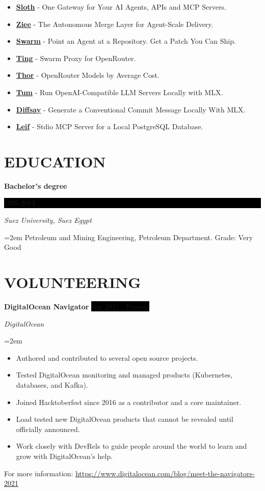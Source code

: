 \documentclass[paper=a4,fontsize=11pt]{scrartcl} %
\newcommand{\sepspace}{\vspace*{1em}}		%
\newcommand{\NewPart}[1]{\section*{\uppercase{#1}}}
\newcommand{\EducationEntry}[4]{
		\noindent \textbf{#1} \hfill      %
		\colorbox{Black}{%
			\parbox{6em}{%
			\hfill\color{White}#2}} \par  %
		\noindent \textit{#3} \par        %
		\noindent\hangindent=2em\hangafter=0 \small #4 %
		\normalsize \par}
\newcommand{\WorkEntry}[4]{				  %
		\noindent \textbf{#1} \hfill      %
		\colorbox{Black}{\color{White}#2} \par  %
		\noindent \textit{#3} \par              %
		\noindent\hangindent=2em\hangafter=0 \small #4 %
		\normalsize \par}
\begin{document}
\begin{itemize}
\item \textbf{\href{https://github.com/Clivern/Sloth}{Sloth}} - One Gateway for Your AI Agents, APIs and MCP Servers.
\item \textbf{\href{https://github.com/Clivern/Ziee}{Ziee}} - The Autonomous Merge Layer for Agent-Scale Delivery.
\item \textbf{\href{https://github.com/Clivern/Swarm}{Swarm}} - Point an Agent at a Repository. Get a Patch You Can Ship.
\item \textbf{\href{https://github.com/Clivern/Ting}{Ting}} - Swarm Proxy for OpenRouter.
\item \textbf{\href{https://github.com/Clivern/Thor}{Thor}} - OpenRouter Models by Average Cost.
\item \textbf{\href{https://github.com/Clivern/Tum}{Tum}} - Run OpenAI-Compatible LLM Servers Locally with MLX.
\item \textbf{\href{https://github.com/Clivern/Diffsay}{Diffsay}} - Generate a Conventional Commit Message Locally With MLX.
\item \textbf{\href{https://github.com/Clivern/Leif}{Leif}} - Stdio MCP Server for a Local PostgreSQL Database.
\end{itemize}


\NewPart{Education}{}

\EducationEntry{Bachelor's degree}{2009-2014}{Suez University, Suez Egypt}{Petroleum and Mining Engineering, Petroleum Department. Grade: Very Good}


\NewPart{Volunteering}{}

\WorkEntry{DigitalOcean Navigator}{Sep 2021 - Present}{DigitalOcean}{\begin{itemize}
\item Authored and contributed to several open source projects.
\item Tested DigitalOcean monitoring and managed products (Kubernetes, databases, and Kafka).
\item Joined Hacktoberfest since 2016 as a contributor and a core maintainer.
\item Load tested new DigitalOcean products that cannot be revealed until officially announced.
\item Work closely with DevRels to guide people around the world to learn and grow with DigitalOcean's help.
\end{itemize}
For more information: \url{https://www.digitalocean.com/blog/meet-the-navigators-2021}}
\sepspace
\end{document}
